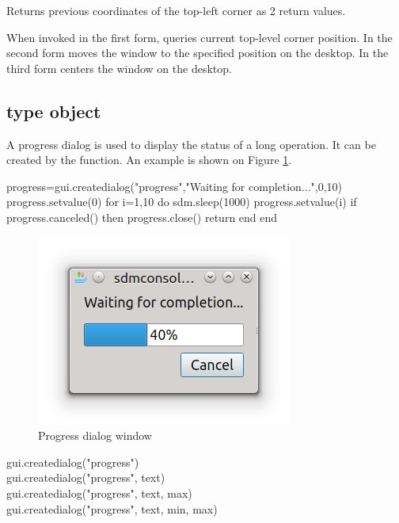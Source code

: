 \documentclass[a4paper,12pt,twoside,extrafontsizes]{memoir}
\begin{document}
\begin{funcret}
	Returns previous coordinates of the top-left corner as 2 return values.
\end{funcret}

\begin{funcremarks}
	When invoked in the first form, queries current top-level corner position. In the second form moves the window to the specified position on the desktop. In the third form centers the window on the desktop.
\end{funcremarks}

\subsection{ type object}

A progress dialog is used to display the status of a long operation. It can be created by the  function. An example is shown on Figure \ref{fig:progressdialog}.

\begin{shellcmds}\begin{luacode}
progress=gui.createdialog("progress","Waiting for completion...",0,10)
progress.setvalue(0)
for i=1,10 do
    sdm.sleep(1000)
    progress.setvalue(i)
    if progress.canceled() then
        progress.close()
        return
    end
end
\end{luacode}\end{shellcmds}

\begin{figure}[htbp]
\centering
\includegraphics{images/progressdialog.png}
\caption{Progress dialog window}
\label{fig:progressdialog}
\end{figure}


\begin{luafuncprototype}
gui.createdialog("progress") \\
gui.createdialog("progress", text) \\
gui.createdialog("progress", text, max) \\
gui.createdialog("progress", text, min, max)
\end{luafuncprototype}
\end{document}
